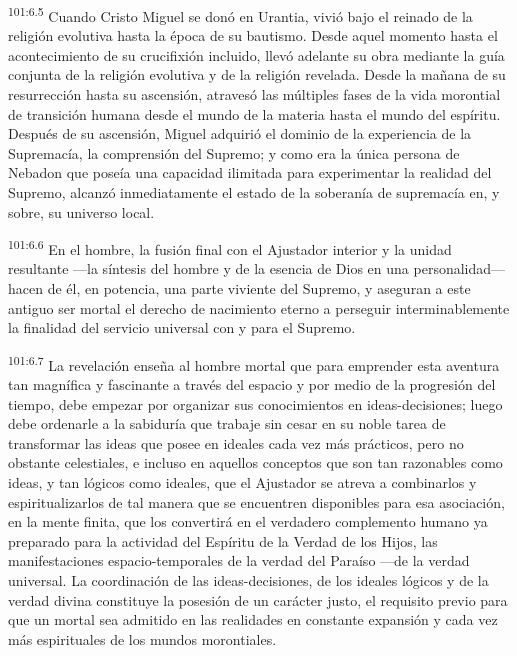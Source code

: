 \documentclass[twoside, 11pt]{book}
\begin{document}
\par
\textsuperscript{101:6.5} Cuando Cristo Miguel se donó en Urantia, vivió bajo el reinado de la religión evolutiva hasta la época de su bautismo. Desde aquel momento hasta el acontecimiento de su crucifixión incluido, llevó adelante su obra mediante la guía conjunta de la religión evolutiva y de la religión revelada. Desde la mañana de su resurrección hasta su ascensión, atravesó las múltiples fases de la vida morontial de transición humana desde el mundo de la materia hasta el mundo del espíritu. Después de su ascensión, Miguel adquirió el dominio de la experiencia de la Supremacía, la comprensión del Supremo; y como era la única persona de Nebadon que poseía una capacidad ilimitada para experimentar la realidad del Supremo, alcanzó inmediatamente el estado de la soberanía de supremacía en, y sobre, su universo local.

\par
\textsuperscript{101:6.6} En el hombre, la fusión final con el Ajustador interior y la unidad resultante ---la síntesis del hombre y de la esencia de Dios en una personalidad--- hacen de él, en potencia, una parte viviente del Supremo, y aseguran a este antiguo ser mortal el derecho de nacimiento eterno a perseguir interminablemente la finalidad del servicio universal con y para el Supremo.

\par
\textsuperscript{101:6.7} La revelación enseña al hombre mortal que para emprender esta aventura tan magnífica y fascinante a través del espacio y por medio de la progresión del tiempo, debe empezar por organizar sus conocimientos en ideas-decisiones; luego debe ordenarle a la sabiduría que trabaje sin cesar en su noble tarea de transformar las ideas que posee en ideales cada vez más prácticos, pero no obstante celestiales, e incluso en aquellos conceptos que son tan razonables como ideas, y tan lógicos como ideales, que el Ajustador se atreva a combinarlos y espiritualizarlos de tal manera que se encuentren disponibles para esa asociación, en la mente finita, que los convertirá en el verdadero complemento humano ya preparado para la actividad del Espíritu de la Verdad de los Hijos, las manifestaciones espacio-temporales de la verdad del Paraíso ---de la verdad universal. La coordinación de las ideas-decisiones, de los ideales lógicos y de la verdad divina constituye la posesión de un carácter justo, el requisito previo para que un mortal sea admitido en las realidades en constante expansión y cada vez más espirituales de los mundos morontiales.
\end{document}
